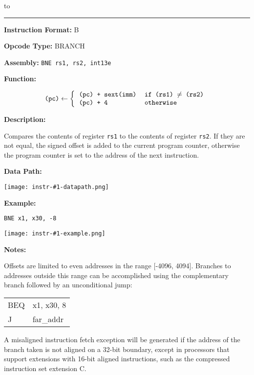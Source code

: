 \documentclass[11pt,twoside,letterpaper,titlepage]{report}
\newcommand{\minipagerestore}{
    \setlength{\parindent}{0pt}
    \setlength{\parskip}{0.5\baselineskip}
}
\newenvironment{instrheader}[5]
{%
\hbox to \textwidth{{\huge\textbf{#1}} \hfil {\Large #2}}
\rule{\textwidth}{0.4pt}

\par
\begin{minipage}{0.5\textwidth}
\textbf{Instruction Format:} #3
\end{minipage}
\begin{minipage}{0.45\textwidth}
\textbf{Opcode Type:} #4
\end{minipage}
\vspace*{0.5\baselineskip}

\par
\textbf{Assembly:} \texttt{#5}
\vspace*{0.5\baselineskip}
\ignorespacesafterend
}
{%
}
\newenvironment{instrfunction}
{%
\par
\textbf{Function:} %
}
{%
\vspace*{0.5\baselineskip}
\ignorespacesafterend
}
\newenvironment{instrdesc}
{%
\par
\textbf{Description:}
\vspace*{0.2\baselineskip}
\par
\hfill\begin{minipage}{\dimexpr\textwidth-1em}\minipagerestore
}
{%
\end{minipage}
\vspace*{\baselineskip}
\ignorespacesafterend
}
\newcommand{\instrdatapathimg}[1]{
\par
\textbf{Data Path:}
\begin{center}
\texttt{[image: instr-\#1-datapath.png]}
\end{center}
}
\newenvironment{instrexample}
{%
\par
\textbf{Example:} %
}
{%
}
\newcommand{\instrexampleimg}[1]{
\par
\begin{center}
\texttt{[image: instr-\#1-example.png]}
\end{center}    
\vspace*{0.5\baselineskip}
}
\newenvironment{instrnotes}
{%
\par
\textbf{Notes:}
\vspace*{0.3\baselineskip}
\par
\hfill\begin{minipage}{\dimexpr\textwidth-1em}\minipagerestore
}
{%
\end{minipage}
}
\begin{document}
\begin{instrheader}{BNE}{Branch if not equal}{B}{BRANCH}{BNE rs1, rs2, int13e}
\end{instrheader}
\begin{instrfunction}
    \[
    \texttt{(pc)} \leftarrow \left\{
    \begin{tabular}{>{\ttfamily}l >{\ttfamily}l}
        (pc) + sext(imm) & if (rs1) $\neq$ (rs2)\\
        (pc) + 4 & otherwise
    \end{tabular} \right.
    \]
\end{instrfunction}
\begin{instrdesc}
    Compares the contents of register \texttt{rs1} to the contents of register \texttt{rs2}. If they
    are not equal, the signed offset is added to the current program counter, otherwise
    the program counter is set to the address of the next instruction.
\end{instrdesc}
\instrdatapathimg{bne}
\begin{instrexample}
    \texttt{BNE x1, x30, -8}
\end{instrexample}
\instrexampleimg{bne}
\begin{instrnotes}
    Offsets are limited to even addresses in the range [-4096, 4094]. Branches to addresses
    outside this range can be accomplished using the complementary branch followed by an
    unconditional jump:
    
    \par
    \begin{tabular}{>{\ttfamily}l >{\ttfamily}l}
        BEQ & x1, x30, 8\\
        J &   far\_addr
    \end{tabular}
    
    \par
    A misaligned instruction fetch exception will be generated if the address of the branch
    taken is not aligned on a 32-bit boundary, except in processors that support extensions with
    16-bit aligned instructions, such as the compressed instruction set extension C.
\end{instrnotes}
\newpage
\end{document}
